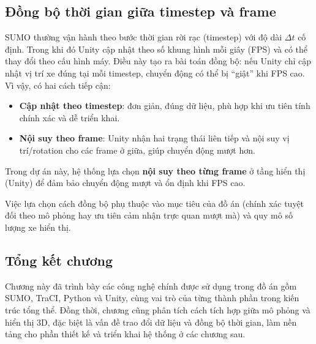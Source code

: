 \documentclass[../DoAn.tex]{subfiles}
\begin{document}
\subsection{Đồng bộ thời gian giữa timestep và frame}
SUMO thường vận hành theo bước thời gian rời rạc (timestep) với độ dài $\Delta t$ cố định. Trong khi đó Unity cập nhật theo số khung hình mỗi giây (FPS) và có thể thay đổi theo cấu hình máy. Điều này tạo ra bài toán đồng bộ: nếu Unity chỉ cập nhật vị trí xe đúng tại mỗi timestep, chuyển động có thể bị ``giật'' khi FPS cao. Vì vậy, có hai cách tiếp cận:
\begin{itemize}[leftmargin=2em]
	\item \textbf{Cập nhật theo timestep}: đơn giản, đúng dữ liệu, phù hợp khi ưu tiên tính chính xác và dễ triển khai.
	\item \textbf{Nội suy theo frame}: Unity nhận hai trạng thái liên tiếp và nội suy vị trí/rotation cho các frame ở giữa, giúp chuyển động mượt hơn.
\end{itemize}

Trong dự án này, hệ thống lựa chọn \textbf{nội suy theo từng frame} ở tầng hiển thị (Unity) để đảm bảo chuyển động mượt và ổn định khi FPS cao.

Việc lựa chọn cách đồng bộ phụ thuộc vào mục tiêu của đồ án (chính xác tuyệt đối theo mô phỏng hay ưu tiên cảm nhận trực quan mượt mà) và quy mô số lượng xe hiển thị.

\subsection{Tổng kết chương}
Chương này đã trình bày các công nghệ chính được sử dụng trong đồ án gồm \gls{SUMO}, \gls{TraCI}, Python và Unity, cùng vai trò của từng thành phần trong kiến trúc tổng thể. Đồng thời, chương cũng phân tích cách tích hợp giữa mô phỏng và hiển thị 3D, đặc biệt là vấn đề trao đổi dữ liệu và đồng bộ thời gian, làm nền tảng cho phần thiết kế và triển khai hệ thống ở các chương sau.
\end{document}
